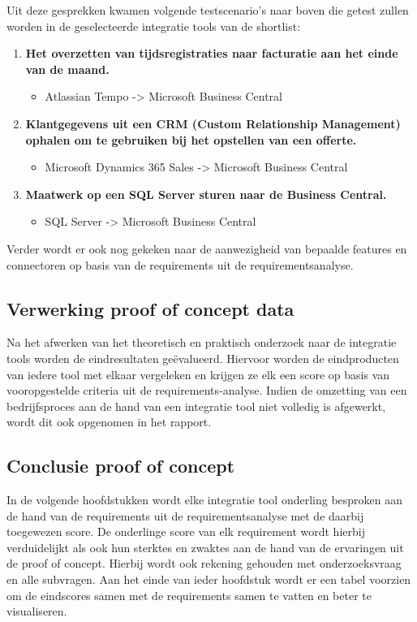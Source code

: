 \vspace{\baselineskip}

Uit deze gesprekken kwamen volgende testscenario’s naar boven die getest zullen worden in de geselecteerde integratie tools van de shortlist:

\begin{enumerate}
    \item \textbf{Het overzetten van tijdsregistraties naar facturatie aan het einde van de maand.}
    \begin{itemize}
        \item Atlassian Tempo -> Microsoft Business Central
    \end{itemize}
    \item \textbf{Klantgegevens uit een CRM (Custom Relationship Management) ophalen om te gebruiken bij het opstellen van een offerte.}
    \begin{itemize}
        \item Microsoft Dynamics 365 Sales -> Microsoft Business Central
    \end{itemize}
    \item \textbf{Maatwerk op een SQL Server sturen naar de Business Central.}
    \begin{itemize}
        \item SQL Server -> Microsoft Business Central
    \end{itemize}
\end{enumerate}

Verder wordt er ook nog gekeken naar de aanwezigheid van bepaalde features en connectoren op basis van de requirements uit de requirementsanalyse.

\subsection{Verwerking proof of concept data}
\label{sec:Verwerking proof of concept dataBP}

Na het afwerken van het theoretisch en praktisch onderzoek naar de integratie tools worden de eindresultaten geëvalueerd. Hiervoor worden de eindproducten van iedere tool met elkaar vergeleken en krijgen ze elk een score op basis van vooropgestelde criteria uit de requirements-analyse. Indien de omzetting van een bedrijfsproces aan de hand van een integratie tool niet volledig is afgewerkt, wordt dit ook opgenomen in het rapport.

\subsection{Conclusie proof of concept}
\label{sec:Conclusie proof of conceptBP}

In de volgende hoofdstukken wordt elke integratie tool onderling besproken aan de hand van de requirements uit de requirementsanalyse met de daarbij toegewezen score. De onderlinge score van elk requirement wordt hierbij verduidelijkt als ook hun sterktes en zwaktes aan de hand van de ervaringen uit de proof of concept. Hierbij wordt ook rekening gehouden met onderzoeksvraag en alle subvragen. Aan het einde van ieder hoofdstuk wordt er een tabel voorzien om de eindscores samen met de requirements samen te vatten en beter te visualiseren.

